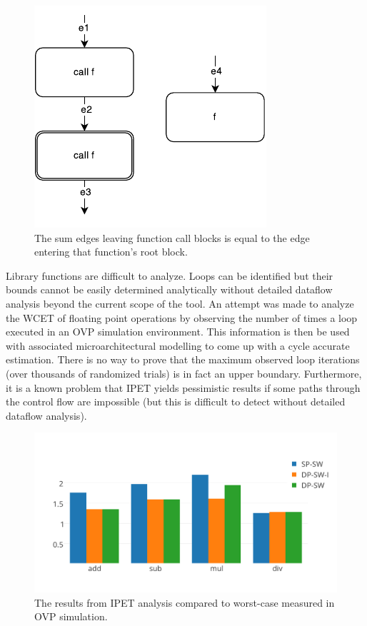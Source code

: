 \documentclass[table,11pt]{article}
\begin{document}
\begin{figure}[h]
\centering
\includegraphics[scale=1]{figures/function-ipet.pdf}
\caption{The sum edges leaving function call blocks is equal to the edge entering that function's root block.} 
\label{f:function-ipet}
\end{figure}
 


Library functions are difficult to analyze. Loops can be identified but their bounds cannot be easily determined analytically without detailed dataflow analysis beyond the current scope of the tool. An attempt was made to analyze the WCET of floating point operations by observing the number of times a loop executed in an OVP simulation environment. This information is then be used with associated microarchitectural modelling to come up with a cycle accurate estimation. There is no way to prove that the maximum observed loop iterations (over thousands of randomized trials) is in fact an upper boundary. Furthermore, it is a known problem that IPET yields pessimistic results if some paths through the control flow are impossible (but this is difficult to detect without detailed dataflow analysis). 


\begin{figure}[h]
\centering
\includegraphics[scale=0.5]{figures/ipetresults}
\caption{The results from IPET analysis compared to worst-case measured in OVP simulation.}
\label{f:ipetresults}
\end{figure}
\end{document}
